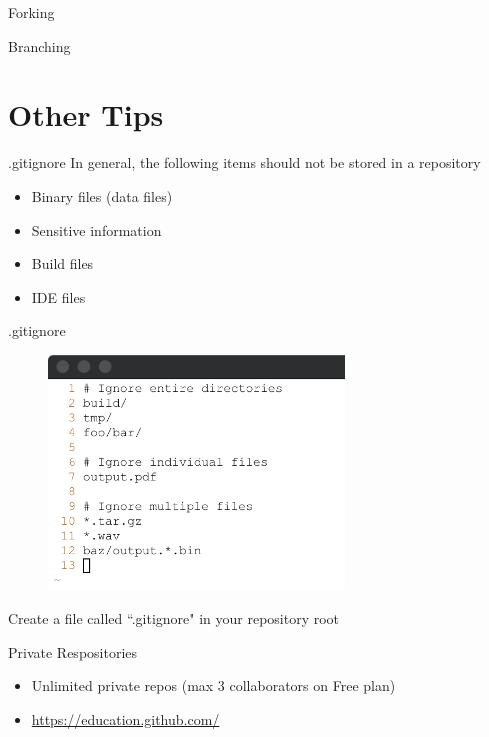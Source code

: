 \documentclass{beamer}
\begin{document}
    \begin{frame}{Forking}
    \end{frame}

    \begin{frame}{Branching}
    \end{frame}

    \section{Other Tips}\label{sec:other-tips}
    \begin{frame}{.gitignore}
        In general, the following items should not be stored in a repository
        \begin{itemize}
            \item Binary files (data files)
            \item Sensitive information
            \item Build files
            \item IDE files
        \end{itemize}
    \end{frame}

    \begin{frame}{.gitignore}
        \begin{figure}
            \centering
            \includegraphics[width=0.7\textwidth]{figures/gitignore.png}
        \end{figure}
        \centering
        Create a file called ``.gitignore" in your repository root
    \end{frame}

    \begin{frame}{Private Respositories}
        \begin{itemize}
            \item Unlimited private repos (max 3 collaborators on Free plan)
            \item \url{https://education.github.com/}
        \end{itemize}
    \end{frame}
\end{document}
